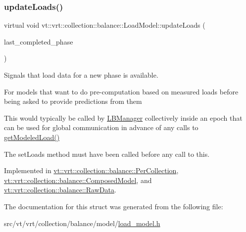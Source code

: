 \mbox{\label{structvt_1_1vrt_1_1collection_1_1balance_1_1_load_model_a4f1c6fb5d7d7a0b147755f025b1d5f5c}} 
\subsubsection{\texorpdfstring{update\+Loads()}{updateLoads()}}
{\footnotesize\ttfamily virtual void vt\+::vrt\+::collection\+::balance\+::\+Load\+Model\+::update\+Loads (\begin{DoxyParamCaption}\item[{\hyperlink{namespacevt_a46ce6733d5cdbd735d561b7b4029f6d7}{Phase\+Type}}]{last\+\_\+completed\+\_\+phase }\end{DoxyParamCaption})\hspace{0.3cm}{\ttfamily [pure virtual]}}



Signals that load data for a new phase is available. 

For models that want to do pre-\/computation based on measured loads before being asked to provide predictions from them

This would typically be called by \hyperlink{structvt_1_1vrt_1_1collection_1_1balance_1_1_l_b_manager}{L\+B\+Manager} collectively inside an epoch that can be used for global communication in advance of any calls to \hyperlink{structvt_1_1vrt_1_1collection_1_1balance_1_1_load_model_a92ee655e6f22652e798151ad5c698ba2}{get\+Modeled\+Load()}

The {\ttfamily set\+Loads} method must have been called before any call to this. 

Implemented in \hyperlink{structvt_1_1vrt_1_1collection_1_1balance_1_1_per_collection_a2b41fbbe2b684654f8dbfd9207b77501}{vt\+::vrt\+::collection\+::balance\+::\+Per\+Collection}, \hyperlink{classvt_1_1vrt_1_1collection_1_1balance_1_1_composed_model_ad8108b4392d63b7f09e443920a64933a}{vt\+::vrt\+::collection\+::balance\+::\+Composed\+Model}, and \hyperlink{structvt_1_1vrt_1_1collection_1_1balance_1_1_raw_data_a4aaae24a53ead0248b873911ce560a34}{vt\+::vrt\+::collection\+::balance\+::\+Raw\+Data}.



The documentation for this struct was generated from the following file\+:\begin{DoxyCompactItemize}
\item 
src/vt/vrt/collection/balance/model/\hyperlink{load__model_8h}{load\+\_\+model.\+h}\end{DoxyCompactItemize}
